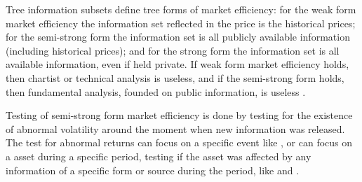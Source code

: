 \documentclass[a4paper]{article}
\begin{document}
Tree information subsets define tree forms of market efficiency: for the weak form market efficiency the information set reflected in the price is the historical prices; for the semi-strong form the information set is all publicly available information (including historical prices); and for the strong form the information set is all available information, even if held private. If weak form market efficiency holds, then chartist or technical analysis is useless, and if the semi-strong form holds, then fundamental analysis, founded on public information, is useless \citet{oprean2012}.

Testing of semi-strong form market efficiency is done by testing for the existence of abnormal volatility around the moment when new information was released. The test for abnormal returns can focus on a specific event like \citet{gabrielribeiro2013}, or can focus on a asset during a specific period, testing if the asset was affected by any information of a specific form or source during the period, like \citet{larsenthorsrud2017} and \citet{caporaleetal2015}.
\end{document}
